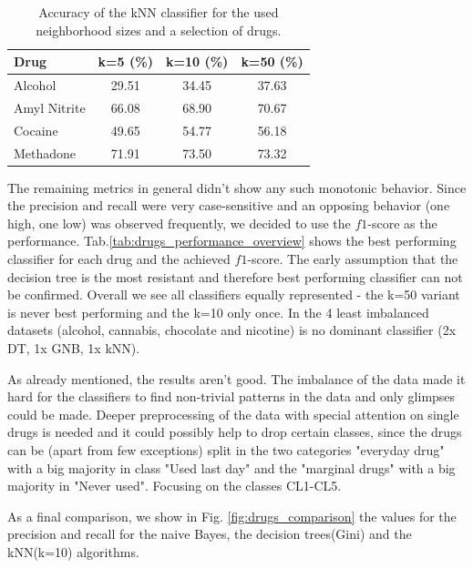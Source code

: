 \documentclass{article}
\begin{document}
\begin{table}[h!]
		\centering
    \begin{tabular}{ l c c c }
        \toprule
        \textbf{Drug} & \textbf{k=5 (\%)} & \textbf{k=10 (\%)} & \textbf{k=50 (\%)} \\
        \toprule
        Alcohol & 29.51 & 34.45 & 37.63 \\
        Amyl Nitrite & 66.08 & 68.90 & 70.67 \\
        Cocaine & 49.65 & 54.77 & 56.18 \\
        Methadone & 71.91 & 73.50 & 73.32 \\
        \bottomrule
    \end{tabular}
		\caption{Accuracy of the kNN classifier for the used neighborhood sizes and a selection of drugs.}
		\label{tab:accuracy_kNN_selection}
\end{table}

The remaining metrics in general didn't show any such monotonic behavior. Since the precision and recall were very case-sensitive and an opposing behavior (one high, one low) was observed frequently, we decided to use the $f1$-score as the performance. Tab.\ref{tab:drugs_performance_overview} shows the best performing classifier for each drug and the achieved $f1$-score.
The early assumption that the decision tree is the most resistant and therefore best performing classifier can not be confirmed. Overall we see all classifiers equally represented - the k=50 variant is never best performing and the k=10 only once. In the 4 least imbalanced datasets (alcohol, cannabis, chocolate and nicotine) is no dominant classifier (2x DT, 1x GNB, 1x kNN).

As already mentioned, the results aren't good. The imbalance of the data made it hard for the classifiers to find non-trivial patterns in the data and only glimpses could be made. Deeper preprocessing of the data with special attention on single drugs is needed and it could possibly help to drop certain classes, since the drugs can be (apart from few exceptions) split in the two categories "everyday drug" with a big majority in class "Used last day" and the "marginal drugs" with a big majority in "Never used". Focusing on the classes CL1-CL5.


As a final comparison, we show in Fig. \ref{fig:drugs_comparison} the values for the precision and recall for the naive Bayes, the decision trees(Gini) and the kNN(k=10) algorithms.
\end{document}
